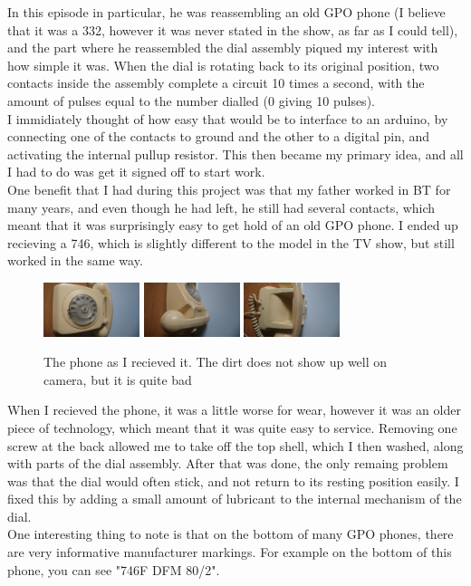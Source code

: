 \documentclass[12pt]{article}
\begin{document}
In this episode in particular, he was reassembling an old GPO phone 
(I believe that it was a 332, however it was never stated in the show, as far as I could tell),
and the part where he reassembled the dial assembly piqued my interest with how simple it was.
When the dial is rotating back to its original position, 
two contacts inside the assembly complete a circuit 10 times a second, 
with the amount of pulses equal to the number dialled (0 giving 10 pulses).\\
I immidiately thought of how easy that would be to interface to an arduino, 
by connecting one of the contacts to ground and the other to a digital pin, 
and activating the internal pullup resistor. This then became my primary idea, 
and all I had to do was get it signed off to start work.\\
One benefit that I had during this project was that my father worked in BT for many years,
and even though he had left, he still had several contacts, 
which meant that it was surprisingly easy to get hold of an old GPO phone.
I ended up recieving a 746, which is slightly different to the model in the TV show,
but still worked in the same way.\\

\begin{figure}[h]
    \centering
    \includegraphics[width=0.25\textwidth]{PhoneFront}
    \includegraphics[width=0.25\textwidth]{PhoneSide}
    \includegraphics[width=0.25\textwidth]{PhoneBack}
    \caption{The phone as I recieved it. The dirt does not show up well on camera, but it is quite bad}
\end{figure}

When I recieved the phone, it was a little worse for wear,
however it was an older piece of technology, which meant that it was quite easy to service.
Removing one screw at the back allowed me to take off the top shell, which I then washed,
along with parts of the dial assembly. After that was done, 
the only remaing problem was that the dial would often stick, 
and not return to its resting position easily. 
I fixed this by adding a small amount of lubricant to the internal mechanism of the dial.\\
One interesting thing to note is that on the bottom of many GPO phones, there are very informative manufacturer markings. 
For example on the bottom of this phone, you can see "746F DFM 80/2".
\end{document}
